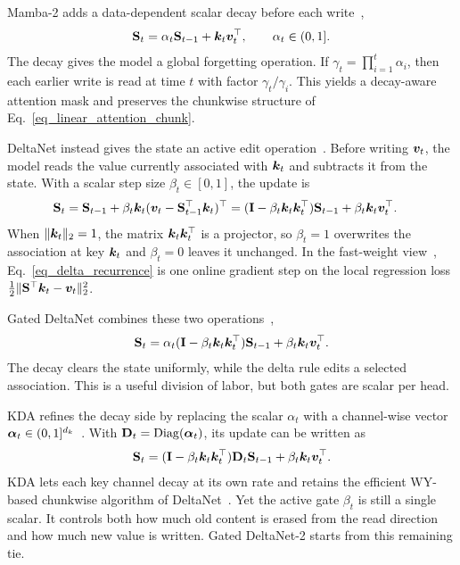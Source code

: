 \documentclass[10pt, logo, onecolumn, copyright]{nv}
\begin{document}
Mamba-2 adds a data-dependent scalar decay before each write~\citep{pmlr-v235-dao24a},
\begin{align}
    {\mathbf{S}}_t = \alpha_t{\mathbf{S}}_{t-1} + {\bm{k}}_t{\bm{v}}_t^\top,
    \qquad
    \alpha_t \in (0, 1] .
\label{eq_mamba2_recurrence}
\end{align}
The decay gives the model a global forgetting operation. If $\gamma_t = \prod_{i=1}^t \alpha_i$, then each earlier write is read at time $t$ with factor $\gamma_t / \gamma_i$. This yields a decay-aware attention mask and preserves the chunkwise structure of Eq.~\ref{eq_linear_attention_chunk}.

DeltaNet instead gives the state an active edit operation~\citep{widrow_adaptive_1988, linear-xmr-fastweight, yang2024parallelizing}. Before writing ${\bm{v}}_t$, the model reads the value currently associated with ${\bm{k}}_t$ and subtracts it from the state. With a scalar step size $\beta_t \in [0,1]$, the update is
\begin{align}
    {\mathbf{S}}_t
    &= {\mathbf{S}}_{t-1} + \beta_t{\bm{k}}_t({\bm{v}}_t - {\mathbf{S}}_{t-1}^\top{\bm{k}}_t)^\top
     = ({\mathbf{I}} - \beta_t{\bm{k}}_t{\bm{k}}_t^\top){\mathbf{S}}_{t-1} + \beta_t{\bm{k}}_t{\bm{v}}_t^\top .
\label{eq_delta_recurrence}
\end{align}
When $\|{\bm{k}}_t\|_2=1$, the matrix ${\bm{k}}_t{\bm{k}}_t^\top$ is a projector, so $\beta_t=1$ overwrites the association at key ${\bm{k}}_t$ and $\beta_t=0$ leaves it unchanged. In the fast-weight view~\citep{Irie2022TheDF, ttt}, Eq.~\ref{eq_delta_recurrence} is one online gradient step on the local regression loss $\frac{1}{2}\|{\mathbf{S}}^\top{\bm{k}}_t - {\bm{v}}_t\|_2^2$.

Gated DeltaNet combines these two operations~\citep{yang2025gated},
\begin{align}
    {\mathbf{S}}_t
    = \alpha_t({\mathbf{I}} - \beta_t{\bm{k}}_t{\bm{k}}_t^\top){\mathbf{S}}_{t-1} + \beta_t{\bm{k}}_t{\bm{v}}_t^\top .
\label{eq_gdn_recurrence}
\end{align}
The decay clears the state uniformly, while the delta rule edits a selected association. This is a useful division of labor, but both gates are scalar per head.

KDA refines the decay side by replacing the scalar $\alpha_t$ with a channel-wise vector ${\bm{\alpha}}_t \in (0,1]^{d_k}$~\citep{team2025kimi}. With ${\mathbf{D}}_t = \operatorname{Diag}({\bm{\alpha}}_t)$, its update can be written as
\begin{align}
    {\mathbf{S}}_t
    = ({\mathbf{I}} - \beta_t{\bm{k}}_t{\bm{k}}_t^\top){\mathbf{D}}_t{\mathbf{S}}_{t-1} + \beta_t{\bm{k}}_t{\bm{v}}_t^\top .
\label{eq_kda_recurrence}
\end{align}
KDA lets each key channel decay at its own rate and retains the efficient WY-based chunkwise algorithm of DeltaNet~\citep{bischof_wy_1985, yang2024parallelizing}. Yet the active gate $\beta_t$ is still a single scalar. It controls both how much old content is erased from the read direction and how much new value is written. Gated DeltaNet-2 starts from this remaining tie.
\end{document}
